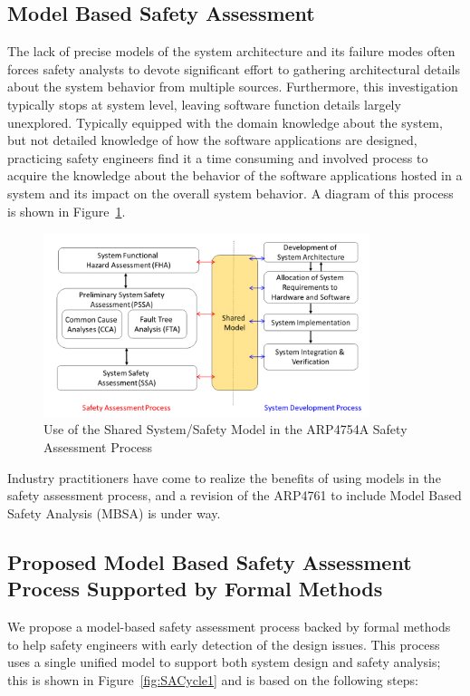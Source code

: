 \subsection{Model Based Safety Assessment}
\label{subsec:mbsa}

The lack of precise models of the system architecture and its failure modes often forces safety analysts to devote significant effort to gathering architectural details about the system behavior from multiple sources. Furthermore, this investigation typically stops at system level, leaving software function details largely unexplored. Typically equipped with the domain knowledge about the system, but not detailed knowledge of how the software applications are designed, practicing safety engineers find it a time consuming and involved process to acquire the knowledge about the behavior of the software applications hosted in a system and its impact on the overall system behavior. A diagram of this process is shown in Figure~\ref{fig:proposed_safety_process}.

\begin{figure}[h]
	\centering
	\includegraphics[trim=0 5 0 5,clip,width=0.85\textwidth]{images/process3.png}
	\caption{Use of the Shared System/Safety Model in the ARP4754A Safety Assessment Process}
	\label{fig:proposed_safety_process}
\end{figure}

Industry practitioners have come to realize the benefits of using models in the safety assessment process, and a revision of the ARP4761 to include Model Based Safety Analysis (MBSA) is under way. 

\subsection{Proposed Model Based Safety Assessment Process Supported by Formal Methods}
We propose a model-based safety assessment process backed by formal methods to help safety engineers with early detection of the design issues.  This process uses a single unified model to support both system design and safety analysis; this is shown in Figure~\ref{fig:SACycle1} and is based on the following steps:

